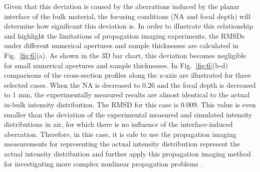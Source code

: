 \documentclass[9pt,twocolumn,twoside]{osajnl}
\begin{document}
Given that this deviation is caused by the aberrations induced by the planar interface of the bulk material, the focusing conditions (NA and focal depth) will determine how significant this deviation is. In order to illustrate this relationship and highlight the limitations of propagation imaging experiments, the RMSDs under different numerical apertures and sample thicknesses are calculated in Fig.~\ref{fig:6}(a). As shown in the 3D bar chart, this deviation becomes negligible for small numerical apertures and sample thicknesses. 
In Fig.~\ref{fig:6}(b-d) comparisons of the cross-section profiles along the z-axis are illustrated for three selected cases. When the NA is decreased to 0.26 and the focal depth is decreased to 1 mm, the experimentally measured results are almost identical to the actual in-bulk intensity distribution. The RMSD for this case is 0.009. This value is even smaller than the deviation of the experimental measured and simulated intensity distributions in air, for which there is no influence of the interface-induced aberration. Therefore, in this case, it is safe to use the propagation imaging measurements for representing the actual intensity distribution represent the actual intensity distribution and further apply this propagation imaging method for investigating more complex nonlinear propagation problems \cite{Chambonneau2020}.

\end{document}
